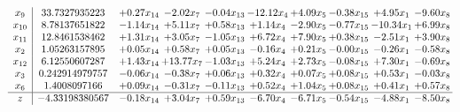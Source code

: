\documentclass[9pt]{article}
\begin{document}
\[\begin{array}{c| c c@{\hskip 2pt} c@{\hskip 2pt} c@{\hskip 2pt} c@{\hskip 2pt} c@{\hskip 2pt} c@{\hskip 2pt} c@{\hskip 2pt} c@{\hskip 2pt} }
 x_{9}   &  33.7327935223 & +  0.27 x_{14} & -2.02 x_{7} & -0.04 x_{13} & -12.12 x_{4} & +  4.09 x_{5} & -0.38 x_{15} & +  4.95 x_{1} & -9.60 x_{8}\\
 x_{10}   &  8.78137651822 & -1.14 x_{14} & +  5.11 x_{7} & +  0.58 x_{13} & +  1.14 x_{4} & -2.90 x_{5} & -0.77 x_{15} & -10.34 x_{1} & +  6.99 x_{8}\\
 x_{11}   &  12.8461538462 & +  1.31 x_{14} & +  3.05 x_{7} & -1.05 x_{13} & +  6.72 x_{4} & +  7.90 x_{5} & +  0.38 x_{15} & -2.51 x_{1} & +  3.90 x_{8}\\
 x_{2}   &  1.05263157895 & +  0.05 x_{14} & +  0.58 x_{7} & +  0.05 x_{13} & -0.16 x_{4} & +  0.21 x_{5} & -0.00 x_{15} & -0.26 x_{1} & -0.58 x_{8}\\
 x_{12}   &  6.12550607287 & +  1.43 x_{14} & + 13.77 x_{7} & -1.03 x_{13} & +  5.24 x_{4} & +  2.73 x_{5} & -0.08 x_{15} & +  7.30 x_{1} & -0.69 x_{8}\\
 x_{3}   &  0.242914979757 & -0.06 x_{14} & -0.38 x_{7} & +  0.06 x_{13} & +  0.32 x_{4} & +  0.07 x_{5} & +  0.08 x_{15} & +  0.53 x_{1} & -0.03 x_{8}\\
 x_{6}   &  1.4008097166 & +  0.09 x_{14} & -0.31 x_{7} & -0.11 x_{13} & +  0.52 x_{4} & +  1.04 x_{5} & +  0.08 x_{15} & +  0.41 x_{1} & +  0.57 x_{8}\\
\hline
z    &  -4.33198380567 & -0.18 x_{14} & +  3.04 x_{7} & +  0.59 x_{13} & -6.70 x_{4} & -6.71 x_{5} & -0.54 x_{15} & -4.88 x_{1} & -8.50 x_{8}\\
\end{array}\]
\end{document}
